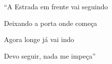 ``A Estrada em frente vai seguindo

Deixando a porta onde começa

Agora longe já vai indo

Devo seguir, nada me impeça''


